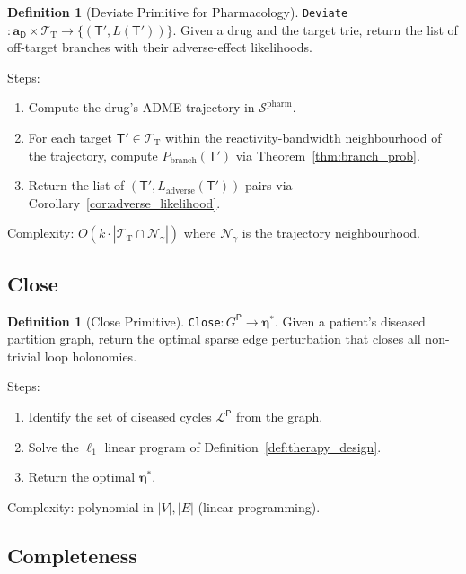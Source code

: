 \documentclass[11pt,twocolumn,a4paper]{article}
\theoremstyle{definition}
\newtheorem{definition}[theorem]{Definition}
\theoremstyle{remark}
\newcommand{\Sspace}{\mathcal{S}}
\newcommand{\Trie}{\mathcal{T}}
\newcommand{\Ttrie}{\Trie_{\mathrm{T}}}
\newcommand{\Drug}{\mathsf{D}}
\newcommand{\Target}{\mathsf{T}}
\newcommand{\Patient}{\mathsf{P}}
\newcommand{\drugaddr}{\mathbf{a}_\Drug}
\begin{document}
\begin{definition}[Deviate Primitive for Pharmacology]
\label{def:deviate_pharm}
\texttt{Deviate}$: \drugaddr \times \Ttrie \to \{(\Target', L(\Target'))\}$. Given a drug and the target trie, return the list of off-target branches with their adverse-effect likelihoods.

Steps:
\begin{enumerate}[nosep,label=(\alph*)]
\item Compute the drug's ADME trajectory in $\Sspace^{\mathrm{pharm}}$.
\item For each target $\Target' \in \Ttrie$ within the reactivity-bandwidth neighbourhood of the trajectory, compute $P_{\mathrm{branch}}(\Target')$ via Theorem~\ref{thm:branch_prob}.
\item Return the list of $(\Target', L_{\mathrm{adverse}}(\Target'))$ pairs via Corollary~\ref{cor:adverse_likelihood}.
\end{enumerate}

Complexity: $O(k \cdot |\Ttrie \cap \mathcal{N}_\gamma|)$ where $\mathcal{N}_\gamma$ is the trajectory neighbourhood.
\end{definition}

\subsection{Close}

\begin{definition}[Close Primitive]
\label{def:close_pharm}
\texttt{Close}$: G^\Patient \to \boldsymbol{\eta}^*$. Given a patient's diseased partition graph, return the optimal sparse edge perturbation that closes all non-trivial loop holonomies.

Steps:
\begin{enumerate}[nosep,label=(\alph*)]
\item Identify the set of diseased cycles $\mathcal{L}^\Patient$ from the graph.
\item Solve the $\ell_1$ linear program of Definition~\ref{def:therapy_design}.
\item Return the optimal $\boldsymbol{\eta}^*$.
\end{enumerate}

Complexity: polynomial in $|V|, |E|$ (linear programming).
\end{definition}

\subsection{Completeness}
\end{document}
